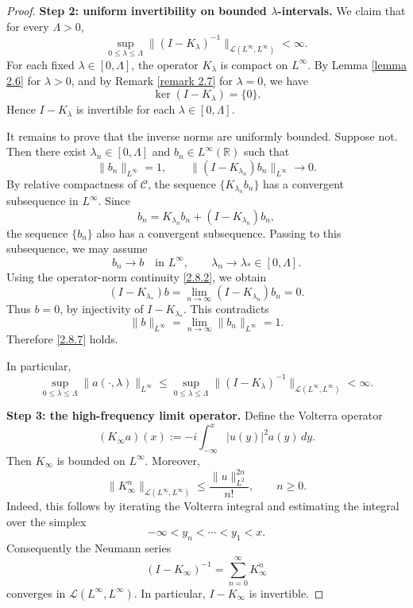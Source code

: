 \documentclass[10pt]{article}
\numberwithin{equation}{section}
\numberwithin{theorem}{section}
\begin{document}
\begin{proof}
\medskip
\noindent\textbf{Step 2: uniform invertibility on bounded \(\lambda\)-intervals.}
We claim that for every \(\Lambda>0\),
\begin{equation}
\label{2.8.7}
\sup_{0\le\lambda\le\Lambda}
\|(I-K_\lambda)^{-1}\|_{\mathcal L(L^\infty,L^\infty)}
<\infty.
\end{equation}
For each fixed \(\lambda\in[0,\Lambda]\), the operator \(K_\lambda\) is compact on
\(L^\infty\). By Lemma \ref{lemma 2.6} for \(\lambda>0\), and by Remark
\ref{remark 2.7} for \(\lambda=0\), we have
\[
\ker(I-K_\lambda)=\{0\}.
\]
Hence \(I-K_\lambda\) is invertible for each \(\lambda\in[0,\Lambda]\).

It remains to prove that the inverse norms are uniformly bounded. Suppose not. Then
there exist \(\lambda_n\in[0,\Lambda]\) and \(b_n\in L^\infty(\mathbb R)\) such that
\begin{equation}
\label{2.8.8}
\|b_n\|_{L^\infty}=1,
\qquad
\|(I-K_{\lambda_n})b_n\|_{L^\infty}\to0.
\end{equation}
By relative compactness of $\mathcal C$, the sequence \(\{K_{\lambda_n}b_n\}\) has a convergent
subsequence in \(L^\infty\). Since
\[
b_n=K_{\lambda_n}b_n+(I-K_{\lambda_n})b_n,
\]
the sequence \(\{b_n\}\) also has a convergent subsequence. Passing to this subsequence,
we may assume
\[
b_n\to b\quad\text{in }L^\infty,
\qquad
\lambda_n\to\lambda_*\in[0,\Lambda].
\]
Using the operator-norm continuity \eqref{2.8.2}, we obtain
\[
(I-K_{\lambda_*})b
=
\lim_{n\to\infty}(I-K_{\lambda_n})b_n
=0.
\]
Thus \(b=0\), by injectivity of \(I-K_{\lambda_*}\). This contradicts
\[
\|b\|_{L^\infty}
=
\lim_{n\to\infty}\|b_n\|_{L^\infty}
=1.
\]
Therefore \eqref{2.8.7} holds.

In particular,
\begin{equation}
\label{2.8.9}
\sup_{0\le\lambda\le\Lambda}
\|a(\cdot,\lambda)\|_{L^\infty}
\le
\sup_{0\le\lambda\le\Lambda}
\|(I-K_\lambda)^{-1}\|_{\mathcal L(L^\infty,L^\infty)}
<\infty.
\end{equation}

\medskip
\noindent\textbf{Step 3: the high-frequency limit operator.}
Define the Volterra operator
\begin{equation}
\label{2.8.10}
(K_\infty a)(x)
:=
-i\int_{-\infty}^x |u(y)|^2a(y)\,dy .
\end{equation}
Then \(K_\infty\) is bounded on \(L^\infty\). Moreover,
\begin{equation}
\label{2.8.11}
\|K_\infty^n\|_{\mathcal L(L^\infty,L^\infty)}
\le
\frac{\|u\|_{L^2}^{2n}}{n!},
\qquad n\ge0.
\end{equation}
Indeed, this follows by iterating the Volterra integral and estimating the integral over
the simplex
\[
-\infty<y_n<\cdots<y_1<x.
\]
Consequently the Neumann series
\begin{equation}
\label{2.8.12}
(I-K_\infty)^{-1}
=
\sum_{n=0}^\infty K_\infty^n
\end{equation}
converges in \(\mathcal L(L^\infty,L^\infty)\). In particular, \(I-K_\infty\) is
invertible.


\end{proof}
\end{document}
